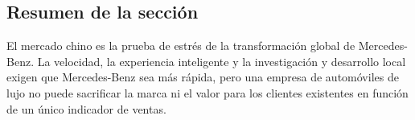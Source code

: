 \subsection{Resumen de la sección}

El mercado chino es la prueba de estrés de la transformación global de Mercedes-Benz. La velocidad, la experiencia inteligente y la investigación y desarrollo local exigen que Mercedes-Benz sea más rápida, pero una empresa de automóviles de lujo no puede sacrificar la marca ni el valor para los clientes existentes en función de un único indicador de ventas.
